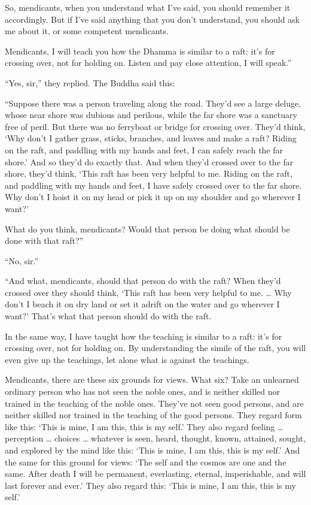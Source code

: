 \documentclass[12pt,openany]{book}%
\begin{document}
So, mendicants, when you understand what I’ve said, you should remember it accordingly. But if I’ve said anything that you don’t understand, you should ask me about it, or some competent mendicants. 

Mendicants, I will teach you how the Dhamma is similar to a raft: it’s for crossing over, not for holding on. Listen and pay close attention, I will speak.” 

“Yes, sir,” they replied. The Buddha said this: 

“Suppose there was a person traveling along the road. They’d see a large deluge, whose near shore was dubious and perilous, while the far shore was a sanctuary free of peril. But there was no ferryboat or bridge for crossing over. They’d think, ‘Why don’t I gather grass, sticks, branches, and leaves and make a raft? Riding on the raft, and paddling with my hands and feet, I can safely reach the far shore.’ And so they’d do exactly that. And when they’d crossed over to the far shore, they’d think, ‘This raft has been very helpful to me. Riding on the raft, and paddling with my hands and feet, I have safely crossed over to the far shore. Why don’t I hoist it on my head or pick it up on my shoulder and go wherever I want?’ 

What do you think, mendicants? Would that person be doing what should be done with that raft?” 

“No, sir.” 

“And what, mendicants, should that person do with the raft? When they’d crossed over they should think, ‘This raft has been very helpful to me. … Why don’t I beach it on dry land or set it adrift on the water and go wherever I want?’ That’s what that person should do with the raft. 

In the same way, I have taught how the teaching is similar to a raft: it’s for crossing over, not for holding on. By understanding the simile of the raft, you will even give up the teachings, let alone what is against the teachings. 

Mendicants, there are these six grounds for views. What six? Take an unlearned ordinary person who has not seen the noble ones, and is neither skilled nor trained in the teaching of the noble ones. They’ve not seen good persons, and are neither skilled nor trained in the teaching of the good persons. They regard form like this: ‘This is mine, I am this, this is my self.’ They also regard feeling … perception … choices … whatever is seen, heard, thought, known, attained, sought, and explored by the mind like this: ‘This is mine, I am this, this is my self.’ And the same for this ground for views: ‘The self and the cosmos are one and the same. After death I will be permanent, everlasting, eternal, imperishable, and will last forever and ever.’ They also regard this: ‘This is mine, I am this, this is my self.’ 
\end{document}
